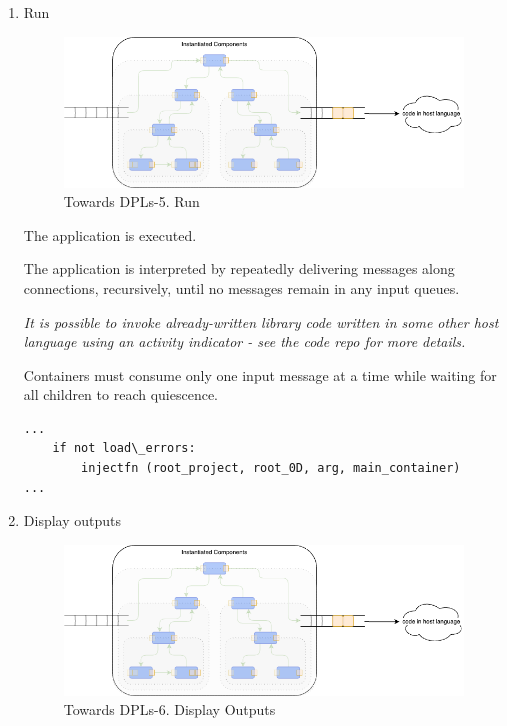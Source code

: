 \documentclass[10pt]{acmart}
\begin{document}
\begin{enumerate}
The first message is constructed using the host language. The message is
injected\footnote{\url{https://github.com/guitarvydas/onward/blob/main/helloworld0d/main.py}} into the input queue of the top-most component.

\begin{verbatim}
...
def start_function (root_project, root_0D, arg, main_container):
    arg = new_datum_string (arg)
    msg = make_message(\"\", arg)
    inject (main_container, msg)
...
\end{verbatim}
  
\item Run
  \begin{figure}[h]
    \centering
    \includegraphics[width=0.8\linewidth]{./media/image7.png}
    \caption{Towards DPLs-5. Run}
    \label{fig:run}
  \end{figure}
The application is executed.

The application is interpreted by repeatedly delivering messages along
connections, recursively, until no messages remain in any input queues.

\emph{It is possible to invoke already-written library code written in some other host language using an activity indicator - see the code repo for more details.}

Containers must consume only one input message at a time while waiting
for all children to reach quiescence.

\begin{verbatim}
...
    if not load\_errors:
        injectfn (root_project, root_0D, arg, main_container)
...
\end{verbatim}
  
\item Display outputs
  \begin{figure}[h]
    \centering
    \includegraphics[width=0.8\linewidth]{./media/image7.png}
    \caption{Towards DPLs-6. Display Outputs}
    \label{fig:display}
  \end{figure}


\end{enumerate}
\end{document}
